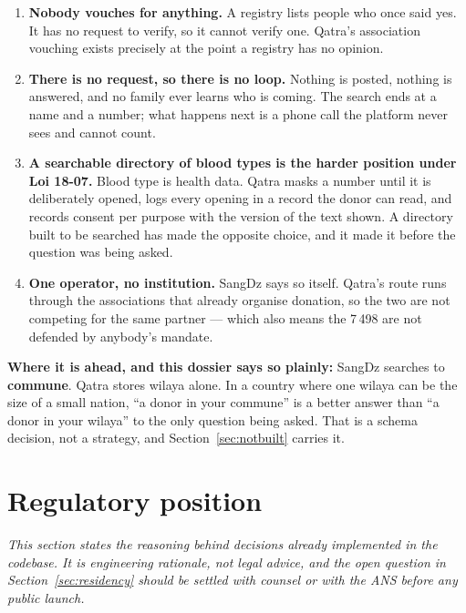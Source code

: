 \documentclass[11pt,a4paper]{article}
\newcommand{\note}[1]{{\small\color{qatraGrey}\textit{#1}}}
\begin{document}
\begin{enumerate}[leftmargin=1.4em]
  \item \textbf{Nobody vouches for anything.} A registry lists people who once
        said yes. It has no request to verify, so it cannot verify one. Qatra's
        association vouching exists precisely at the point a registry has no
        opinion.
  \item \textbf{There is no request, so there is no loop.} Nothing is posted,
        nothing is answered, and no family ever learns who is coming. The search
        ends at a name and a number; what happens next is a phone call the
        platform never sees and cannot count.
  \item \textbf{A searchable directory of blood types is the harder position
        under Loi 18-07.} Blood type is health data. Qatra masks a number until
        it is deliberately opened, logs every opening in a record the donor can
        read, and records consent per purpose with the version of the text
        shown. A directory built to be searched has made the opposite choice,
        and it made it before the question was being asked.
  \item \textbf{One operator, no institution.} SangDz says so itself. Qatra's
        route runs through the associations that already organise donation, so
        the two are not competing for the same partner — which also means the
        7\,498 are not defended by anybody's mandate.
\end{enumerate}

\textbf{Where it is ahead, and this dossier says so plainly:} SangDz searches to
\textbf{commune}. Qatra stores wilaya alone. In a country where one wilaya can
be the size of a small nation, ``a donor in your commune'' is a better answer
than ``a donor in your wilaya'' to the only question being asked. That is a
schema decision, not a strategy, and Section~\ref{sec:notbuilt} carries it.

\section{Regulatory position}

\note{This section states the reasoning behind decisions already implemented in
the codebase. It is engineering rationale, not legal advice, and the open
question in Section~\ref{sec:residency} should be settled with counsel or with
the ANS before any public launch.}
\end{document}
